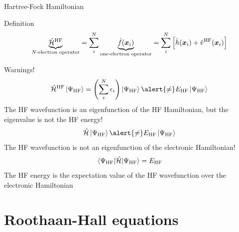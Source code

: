 \documentclass[aspectratio=169,9pt]{beamer}
\newcommand{\bx}{\boldsymbol{x}}
\newcommand{\hh}{\hat{h}}
\newcommand{\hf}{\hat{f}}
\newcommand{\chH}{\Hat{\mathcal{H}}}
\begin{document}
\begin{frame}{Hartree-Fock Hamiltonian}
	\begin{block}{Definition}
		\begin{equation}
			\underbrace{\chH^\text{HF}}_{\text{$N$-electron operator}} 
			= \sum_i^N \underbrace{\hf(\bx_i)}_{\text{one-electron operator}}
			= \sum_i^N \qty[ \hh(\bx_i) + \Hat{v}^\text{HF}(\bx_i) ]
		\end{equation}
	\end{block}
	\begin{block}{Warnings!}
		\begin{equation}
			\chH^\text{HF} \ket{\Psi_\text{HF}} = \qty( \sum_i^N \epsilon_i ) \ket{\Psi_\text{HF}}
			\alert{\neq} E_\text{HF} \ket{\Psi_\text{HF}}
		\end{equation}
		The HF wavefunction is an eigenfunction of the HF Hamiltonian, but the eigenvalue is \alert{not} the HF energy!
		\begin{equation}
			\chH \ket{\Psi_\text{HF}} \alert{\neq} E_\text{HF} \ket{\Psi_\text{HF}}
		\end{equation}
		The HF wavefunction is \alert{not} an eigenfunction of the electronic Hamiltonian!
		\begin{equation}
			\mel{\Psi_\text{HF}}{\chH}{\Psi_\text{HF}} = E_\text{HF}
		\end{equation}
		The HF energy is the expectation value of the HF wavefunction over the electronic Hamiltonian
	\end{block}
\end{frame}


\section{Roothaan-Hall equations}
\end{document}
